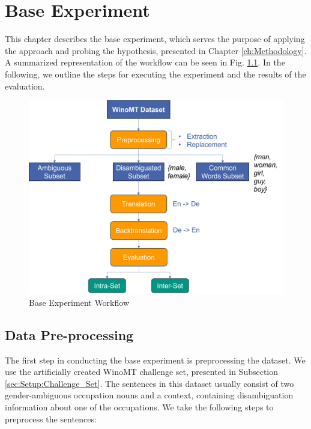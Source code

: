 \chapter{Base Experiment}
\label{ch:Base_Experiment}

This chapter describes the base experiment, which serves the purpose of applying the approach and probing the hypothesis, presented in Chapter \ref{ch:Methodology}. A summarized representation of the workflow can be seen in Fig. \ref{fig:base_workflow}. In the following, we outline the steps for executing the experiment and the results of the evaluation.

\begin{figure}[!htb]
  \centering
  \includegraphics[scale=0.55]{figures/base_workflow.png}
  \caption{Base Experiment Workflow}
  \label{fig:base_workflow}
\end{figure}

\section{Data Pre-processing}
\label{sec:Base_Experiment:Pre-processing}
The first step in conducting the base experiment is preprocessing the dataset. We use the artificially created WinoMT challenge set, presented in Subsection \ref{sec:Setup:Challenge_Set}. The sentences in this dataset usually consist of two gender-ambiguous occupation nouns and a context, containing disambiguation information about one of the occupations. We take the following steps to preprocess the sentences:


